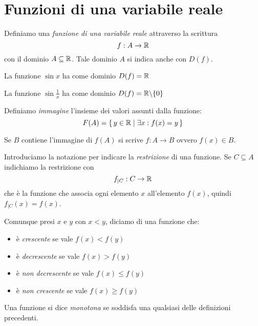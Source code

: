 \section{Funzioni di una variabile reale}

Definiamo una \emph{funzione di una variabile reale} attraverso la scrittura
\begin{equation*}
f: A \to \mathbb R
\end{equation*}
con il dominio $A \subseteq \mathbb R$. Tale dominio $A$ si indica anche con $D(f)$.

\begin{example}
La funzione $\sin x$ ha come dominio $D(f) = \mathbb R$
\end{example} 
\begin{example}
La funzione $\sin \frac{1}{x}$ ha come dominio $D(f) = \mathbb R \backslash \{0\}$
\end{example} 

Definiamo \emph{immagine} l'insieme dei valori assunti dalla funzione:
\begin{equation*}
F(A) = \set{y \in \mathbb R| \exists x : f(x) = y}
\end{equation*}

Se $B$ contiene l'immagine di $f(A)$ si scrive $f: A \to B$ ovvero $f(x) \in B$.

Introduciamo la notazione per indicare la \emph{restrizione} di una funzione. Se $C \subseteq A$ indichiamo la restrizione con
\begin{equation*}
f_{|C} : C \to \mathbb R
\end{equation*}
che è la funzione che associa ogni elemento $x$ all'elemento $f(x)$, quindi $f_{|C} (x) = f(x)$.

\begin{definition}
Comunque presi $x$ e $y$ con $x < y$, diciamo di una funzione che:
\begin{itemize}
\item è \emph{crescente} se vale $f(x) < f(y)$
\item è \emph{decrescente} se vale $f(x) > f(y)$
\item è \emph{non decrescente} se vale $f(x) \le f(y)$
\item è \emph{non crescente} se vale $f(x) \ge f(y)$
\end{itemize}
\end{definition}

\begin{definition}
Una funzione si dice \emph{monotona} se soddisfa una qualsiasi delle definizioni precedenti.
\end{definition}

